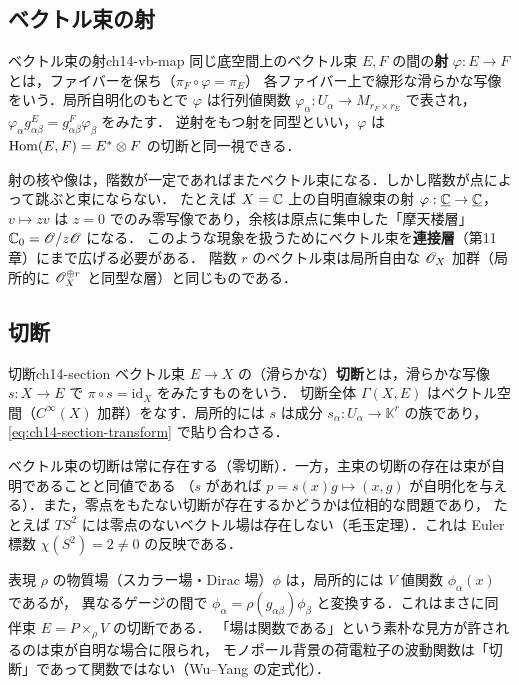 \subsection{ベクトル束の射}

\begin{mydef}{ベクトル束の射}{ch14-vb-map}
同じ底空間上のベクトル束 $E,F$ の間の\textbf{射} $\varphi:E\to F$ とは，ファイバーを保ち（$\pi_F\circ\varphi=\pi_E$）
各ファイバー上で線形な滑らかな写像をいう．局所自明化のもとで $\varphi$ は行列値関数 $\varphi_\alpha:U_\alpha\to M_{r_F\times r_E}$ で表され，
$\varphi_\alpha g^E_{\alpha\beta} = g^F_{\alpha\beta}\varphi_\beta$ をみたす．
逆射をもつ射を同型といい，$\varphi$ は $\operatorname{Hom}(E,F)=E^*\otimes F$ の切断と同一視できる．
\end{mydef}

射の核や像は，階数が一定であればまたベクトル束になる．しかし階数が点によって跳ぶと束にならない．
たとえば $X=\mathbb{C}$ 上の自明直線束の射 $\varphi:\underline{\mathbb{C}}\to\underline{\mathbb{C}}$，$v\mapsto zv$ は
$z=0$ でのみ零写像であり，余核は原点に集中した「摩天楼層」$\mathbb{C}_0=\mathscr{O}/z\mathscr{O}$ になる．
このような現象を扱うためにベクトル束を\textbf{連接層}（第11章）にまで広げる必要がある．
階数 $r$ のベクトル束は局所自由な $\mathscr{O}_X$ 加群（局所的に $\mathscr{O}_X^{\oplus r}$ と同型な層）と同じものである．

\subsection{切断}

\begin{mydef}{切断}{ch14-section}
ベクトル束 $E\to X$ の（滑らかな）\textbf{切断}とは，滑らかな写像 $s:X\to E$ で $\pi\circ s=\mathrm{id}_X$ をみたすものをいう．
切断全体 $\Gamma(X,E)$ はベクトル空間（$C^\infty(X)$ 加群）をなす．局所的には $s$ は成分 $s_\alpha:U_\alpha\to\mathbb{K}^r$ の族であり，
\eqref{eq:ch14-section-transform} で貼り合わさる．
\end{mydef}

ベクトル束の切断は常に存在する（零切断）．一方，主束の切断の存在は束が自明であることと同値である
（$s$ があれば $p=s(x)g\mapsto (x,g)$ が自明化を与える）．また，零点をもたない切断が存在するかどうかは位相的な問題であり，
たとえば $TS^2$ には零点のないベクトル場は存在しない（毛玉定理）．これは Euler 標数 $\chi(S^2)=2\neq0$ の反映である．

\begin{physbox}[物質場は同伴束の切断]
表現 $\rho$ の物質場（スカラー場・Dirac 場）$\phi$ は，局所的には $V$ 値関数 $\phi_\alpha(x)$ であるが，
異なるゲージの間で $\phi_\alpha=\rho(g_{\alpha\beta})\phi_\beta$ と変換する．これはまさに同伴束 $E=P\times_\rho V$ の切断である．
「場は関数である」という素朴な見方が許されるのは束が自明な場合に限られ，
モノポール背景の荷電粒子の波動関数は「切断」であって関数ではない（Wu--Yang の定式化）．
\end{physbox}

